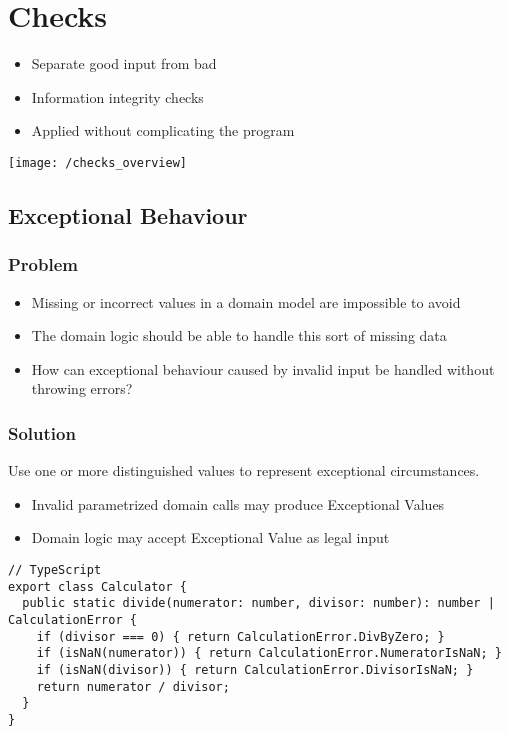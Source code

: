 
\section{Checks}
\begin{itemize}[topsep=0pt]
    \itemsep -0.4em
    \item Separate good input from bad
    \item Information integrity checks
    \item Applied without complicating the program
\end{itemize}
\texttt{[image: /checks\_overview]}

\subsection{Exceptional Behaviour}
\subsubsection{Problem}
\begin{itemize}[topsep=0pt]
    \itemsep -0.4em
    \item Missing or incorrect values in a domain model are impossible to avoid
    \item The domain logic should be able to handle this sort of missing data
    \item How can exceptional behaviour caused by invalid input be handled without throwing errors?
\end{itemize}
\subsubsection{Solution}
Use one or more distinguished values to represent exceptional circumstances.
\begin{itemize}[topsep=0pt]
    \itemsep -0.4em
    \item Invalid parametrized domain calls may produce Exceptional Values
    \item Domain logic may accept Exceptional Value as legal input
\end{itemize}
\begin{lstlisting}[style=htmlcssjs]
// TypeScript
export class Calculator {
  public static divide(numerator: number, divisor: number): number | CalculationError {
    if (divisor === 0) { return CalculationError.DivByZero; }
    if (isNaN(numerator)) { return CalculationError.NumeratorIsNaN; }
    if (isNaN(divisor)) { return CalculationError.DivisorIsNaN; }
    return numerator / divisor;
  }
}
\end{lstlisting}

